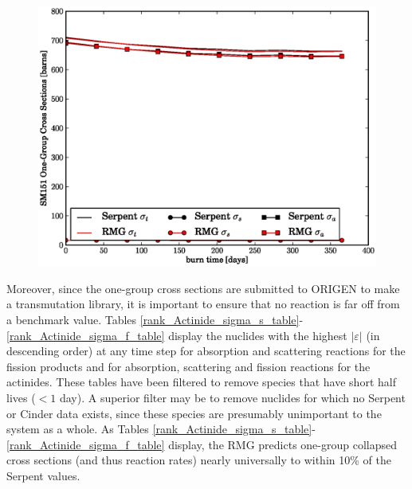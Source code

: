 \begin{figure}[htbp]
\begin{center}
\includegraphics[scale=0.3]{multigroup_method/figs/benchmark/SM151_1g_xs.eps}
\end{center}
\end{figure}

Moreover, since the one-group cross sections are submitted to ORIGEN to make a transmutation library, 
it is important to ensure that no reaction is far off from a benchmark value.  Tables 
\ref{rank_Actinide_sigma_s_table}-\ref{rank_Actinide_sigma_f_table} display the 
nuclides with the highest $|\varepsilon|$ (in descending order) at any time step for absorption and scattering
reactions for the fission products and for absorption, scattering and fission reactions for the actinides.
These tables have been filtered to remove species that have short half lives ($<1$ day).  A superior 
filter may be to remove nuclides for which no Serpent or Cinder data exists, since these species are 
presumably unimportant to the system as a whole.
As Tables \ref{rank_Actinide_sigma_s_table}-\ref{rank_Actinide_sigma_f_table} display, 
the RMG predicts one-group collapsed cross sections (and thus reaction rates) nearly universally to 
within 10\% of the Serpent values.







